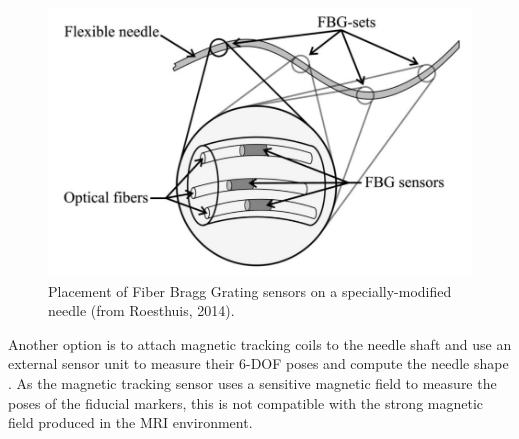 \begin{figure}[h]
\includegraphics[width=1.0\textwidth]{Fig/chap2/fbg_needle.png}
\caption{Placement of Fiber Bragg Grating sensors on a specially-modified needle (from Roesthuis, 2014).}
\label{fig:needle_fbg}
\end{figure}

Another option is to attach magnetic tracking coils to the needle shaft and use an external sensor unit to measure their 6-DOF poses and compute the needle shape
\cite{patil_needle_2014,wang_real-time_2015}. As the magnetic tracking sensor uses a sensitive magnetic field to measure the poses of the fiducial markers, this is not compatible with the strong magnetic field produced in the MRI environment.
